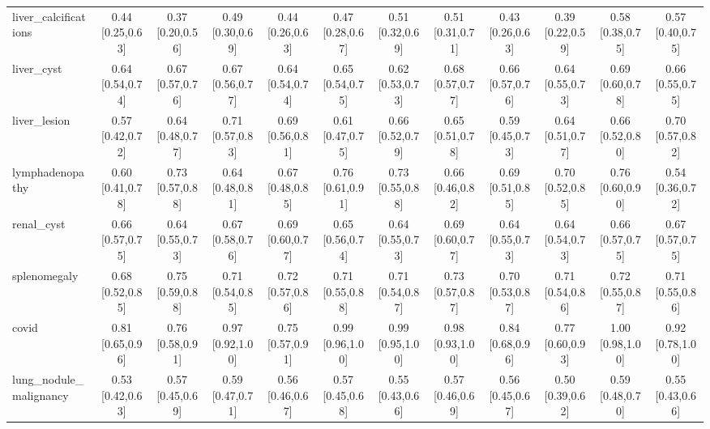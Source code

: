 \begin{tabular}{lccccccccccc}
liver\_calcifications & 0.44 [0.25,0.63] & 0.37 [0.20,0.56] & 0.49 [0.30,0.69] & 0.44 [0.26,0.63] & 0.47 [0.28,0.67] & 0.51 [0.32,0.69] & 0.51 [0.31,0.71] & 0.43 [0.26,0.63] & 0.39 [0.22,0.59] & 0.58 [0.38,0.75] & 0.57 [0.40,0.75] \\
liver\_cyst & 0.64 [0.54,0.74] & 0.67 [0.57,0.76] & 0.67 [0.56,0.77] & 0.64 [0.54,0.74] & 0.65 [0.54,0.75] & 0.62 [0.53,0.73] & 0.68 [0.57,0.77] & 0.66 [0.57,0.76] & 0.64 [0.55,0.73] & 0.69 [0.60,0.78] & 0.66 [0.55,0.75] \\
liver\_lesion & 0.57 [0.42,0.72] & 0.64 [0.48,0.77] & 0.71 [0.57,0.83] & 0.69 [0.56,0.81] & 0.61 [0.47,0.75] & 0.66 [0.52,0.79] & 0.65 [0.51,0.78] & 0.59 [0.45,0.73] & 0.64 [0.51,0.77] & 0.66 [0.52,0.80] & 0.70 [0.57,0.82] \\
lymphadenopathy & 0.60 [0.41,0.78] & 0.73 [0.57,0.88] & 0.64 [0.48,0.81] & 0.67 [0.48,0.85] & 0.76 [0.61,0.91] & 0.73 [0.55,0.88] & 0.66 [0.46,0.82] & 0.69 [0.51,0.85] & 0.70 [0.52,0.85] & 0.76 [0.60,0.90] & 0.54 [0.36,0.72] \\
renal\_cyst & 0.66 [0.57,0.75] & 0.64 [0.55,0.73] & 0.67 [0.58,0.76] & 0.69 [0.60,0.77] & 0.65 [0.56,0.74] & 0.64 [0.55,0.73] & 0.69 [0.60,0.77] & 0.64 [0.55,0.73] & 0.64 [0.54,0.73] & 0.66 [0.57,0.75] & 0.67 [0.57,0.75] \\
splenomegaly & 0.68 [0.52,0.85] & 0.75 [0.59,0.88] & 0.71 [0.54,0.85] & 0.72 [0.57,0.86] & 0.71 [0.55,0.88] & 0.71 [0.54,0.87] & 0.73 [0.57,0.87] & 0.70 [0.53,0.87] & 0.71 [0.54,0.86] & 0.72 [0.55,0.87] & 0.71 [0.55,0.86] \\
covid & 0.81 [0.65,0.96] & 0.76 [0.58,0.91] & 0.97 [0.92,1.00] & 0.75 [0.57,0.91] & 0.99 [0.96,1.00] & 0.99 [0.95,1.00] & 0.98 [0.93,1.00] & 0.84 [0.68,0.96] & 0.77 [0.60,0.93] & 1.00 [0.98,1.00] & 0.92 [0.78,1.00] \\
lung\_nodule\_malignancy & 0.53 [0.42,0.63] & 0.57 [0.45,0.69] & 0.59 [0.47,0.71] & 0.56 [0.46,0.67] & 0.57 [0.45,0.68] & 0.55 [0.43,0.66] & 0.57 [0.46,0.69] & 0.56 [0.45,0.67] & 0.50 [0.39,0.62] & 0.59 [0.48,0.70] & 0.55 [0.43,0.66] \\
\bottomrule
\end{tabular}
